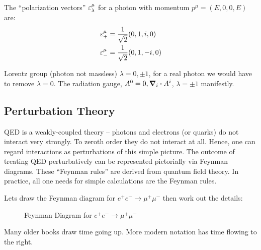 The ``polarization vectors'' $\varepsilon^\mu_\lambda$ for a photon with momentum $p^\mu=(E,0,0,E)$ are:
\begin{align*}
  \varepsilon^\mu_+&=\frac1{\sqrt{2}}(0,1,i,0)\\
  \varepsilon^\mu_-&=\frac1{\sqrt{2}}(0,1,-i,0)
\end{align*}

\begin{aside}
  Lorentz group (photon not massless) $\lambda=0,\pm1$, for a real photon we would have to remove $\lambda=0$. The radiation gauge, $A^0=0, \grad_i\vdot A^i$, $\lambda=\pm1$ manifestly.
\end{aside}

\subsection{Perturbation Theory}
QED is a weakly-coupled theory -- photons and electrons (or quarks) do not interact very strongly. To zeroth order they do not interact at all. Hence, one can regard interactions as perturbations of this simple picture. The outcome of treating QED perturbatively can be represented pictorially via Feynman diagrams. These ``Feynman rules'' are derived from quantum field theory. In practice, all one needs for simple calculations are the Feynman rules.

Lets draw the Feynman diagram for $e^+e^-\to\mu^+\mu^-$ then work out the details:
\begin{figure}[H]
  \centering
  \caption{Feynman Diagram for $e^+e^-\to\mu^+\mu^-$}
\end{figure}

\begin{aside}
  Many older books draw time going up. More modern notation has time flowing to the right. 
\end{aside}

